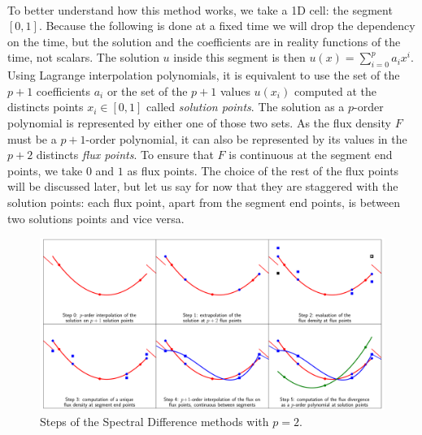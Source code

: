       \paragraph{}
      To better understand how this method works, we take a 1D cell: the segment $\left[0, 1\right]$.
      Because the following is done at a fixed time we will drop the dependency on the time, but the solution and the coefficients are in reality functions of the time, not scalars.
      The solution $u$ inside this segment is then $u\left(x\right) = \sum_{i=0}^p a_ix^i$.
      Using Lagrange interpolation polynomials, it is equivalent to use the set of the $p + 1$ coefficients $a_i$ or the set of the $p + 1$ values $u\left(x_i\right)$ computed at the distincts points $x_i \in \left[0, 1\right]$ called \emph{solution points}.
      The solution as a $p$-order polynomial is represented by either one of those two sets.
      As the flux density $F$ must be a $p\!+\!1$-order polynomial, it can also be represented by its values in the $p + 2$ distincts \emph{flux points}.
      To ensure that $F$ is continuous at the segment end points, we take $0$ and $1$ as flux points.
      The choice of the rest of the flux points will be discussed later, but let us say for now that they are staggered with the solution points: each flux point, apart from the segment end points, is between two solutions points and vice versa.

      \begin{figure}
        \centering
        \includegraphics[width=\textwidth]{figures/sd_scheme.png}
        \caption{Steps of the Spectral Difference methods with $p = 2$.}
        \label{fig:sd_scheme}
      \end{figure}

